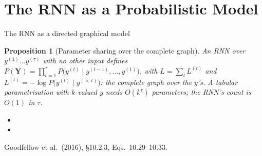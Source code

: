 \documentclass[aspectratio=169, 11pt]{beamer}
\newtheorem{propx}[theorem]{Proposition}
\newcommand{\srcline}[1]{%
  \par\vspace{0.25em}%
  {\scriptsize\color{mcMuted}\hfill #1\par}}
\newcommand{\src}[3]{}      %
\begin{document}
\section{The RNN as a Probabilistic Model}

\begin{frame}{The RNN as a directed graphical model}
  \src{goodfellow2016}{equation}{10.29-10.33}
  \src{goodfellow2016}{section}{10.2.3}
  \vspace{-0.6em}
  \begin{propx}[Parameter sharing over the complete graph]\label{th:gm}
    \small
    An RNN over $y^{(1)} \ldots y^{(\tau)}$ with no other input defines
    $P(\mathbf{Y}) = \prod_{t=1}^{\tau} P\big(y^{(t)} \mid y^{(t-1)}, \ldots, y^{(1)}\big)$,
    with $L = \sum_t L^{(t)}$ and $L^{(t)} = -\log P\big(y^{(t)} \mid y^{(<t)}\big)$:
    the complete graph over the $y$'s. A tabular parametrisation with
    $k$-valued $y$ needs $O(k^{\tau})$ parameters; the RNN's count is $O(1)$ in $\tau$.
  \end{propx}
  \vspace{-0.1em}
  {\footnotesize
  \begin{itemize}\itemsep0.12em
    \item {}
    \item {}
  \end{itemize}}
  \vspace{-0.3em}
  \srcline{Goodfellow et al.\ (2016), \S10.2.3, Eqs.~10.29--10.33.}
\end{frame}
\end{document}
